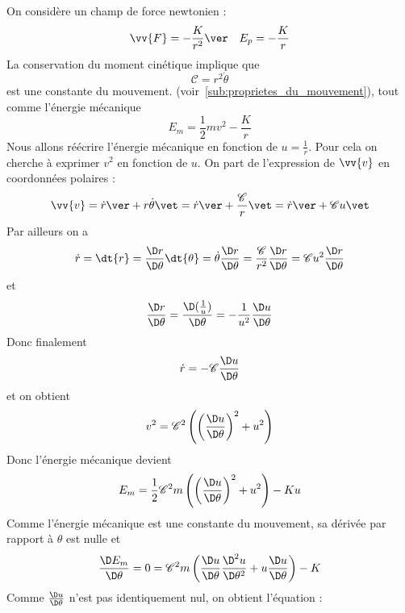 \documentclass{cours}
\begin{document}
 On considère un champ de force newtonien :
 \begin{equation}
 \vv{F} = -\frac{K}{r^2}\ver \quad E_p = -\frac{K}{r}
 \end{equation}
 La conservation du moment cinétique implique que 
 \newcommand{\cc}{\mathscr{C}}
 \begin{equation}
   \mathscr{C} = r^2 \dot{\theta}
 \end{equation}
 est une constante du mouvement. (voir~\ref{sub:proprietes_du_mouvement}), tout comme l'énergie mécanique
 \begin{equation}
   E_m = \frac{1}{2}mv^2 - \frac{K}{r}
 \end{equation}
 Nous allons réécrire l'énergie mécanique en fonction de $u=\frac{1}{r}$. Pour cela on cherche à exprimer $v^2$ en fonction de $u$.
 On part de l'expression de $\vv{v}$ en coordonnées polaires :
 \begin{equation}
   \vv{v} = \dot{r}\ver + r \dot{\theta}\vet  = \dot{r}\ver + \frac{\cc}{r}\vet = \dot{r}\ver  + \cc u \vet  
 \end{equation} 
Par ailleurs on a
\begin{equation}
  \dot{r}=\dt{r}=\frac{\D r}{\D \theta} \dt{\theta} = \dot{\theta}\frac{\D r}{\D\theta} = \frac{\cc}{r^2}\frac{\D r}{\D\theta} = \cc u^2 \frac{\D r}{\D\theta}
\end{equation}
et
\begin{equation}
  \frac{\D r}{\D\theta} = \frac{\D(\frac{1}{u})}{\D \theta} = -\frac{1}{u^2}\frac{\D u}{\D \theta}
\end{equation}
Donc finalement
\begin{equation}
  \dot{r} = -\cc \frac{\D u}{\D \theta}
\end{equation}
et on obtient
\begin{equation}
  v^2 = \cc^2 \left( \left( \frac{\D u }{\D \theta} \right)^2 + u^2 \right) 
\end{equation}
Donc l'énergie mécanique devient
\begin{equation}
  E_m = \frac{1}{2}\cc^2 m \left( \left( \frac{\D u}{\D \theta} \right)^2 + u^2 \right) - Ku
\end{equation}
Comme l'énergie mécanique est une constante du mouvement, sa dérivée par rapport à $\theta$ est nulle et
\begin{equation}
  \frac{\D E_m}{\D \theta} = 0 = \cc^2 m \left( \frac{\D u}{\D \theta}\frac{\D^2 u}{\D \theta^2} + u \frac{\D u }{\D \theta} \right) -K 
\end{equation}
Comme $\frac{\D u}{\D\theta}$ n'est pas identiquement nul, on obtient l'équation :
\end{document}

